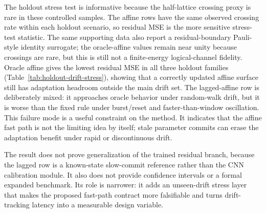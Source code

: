 \documentclass[11pt]{article}
\begin{document}
The holdout stress test is informative because the half-lattice crossing proxy
is rare in these controlled samples.  The affine rows have the same observed
crossing rate within each holdout scenario, so residual MSE is the more
sensitive stress-test statistic.  The same supporting data also report a
residual-boundary Pauli-style identity surrogate; the oracle-affine
values remain near unity because crossings are rare, but this is still not a
finite-energy logical-channel fidelity.  Oracle affine gives the lowest
residual MSE in all three holdout families
(Table~\ref{tab:holdout-drift-stress}), showing that a correctly updated
affine surface still has adaptation headroom outside the main drift set.  The
lagged-affine row is deliberately mixed: it approaches oracle behavior under
random-walk drift, but it is worse than the fixed rule under burst/reset and
faster-than-window oscillation.  This failure mode is a useful constraint on
the method.  It indicates that the affine fast path is not the limiting idea
by itself; stale parameter commits can erase the adaptation benefit under
rapid or discontinuous drift.

The result does not prove generalization of the trained residual branch,
because the lagged row is a known-state slow-commit reference rather than the
CNN calibration module.  It also does not provide confidence intervals or a
formal expanded benchmark.  Its role is narrower: it adds an unseen-drift
stress layer that makes the proposed fast-path contract more falsifiable and
turns drift-tracking latency into a measurable design variable.

\begin{table}[t]
\centering
\small
{}
\caption{Controlled known-state holdout drift stress diagnostic.  Entries are residual MSE
across 384 sequences of 512 steps unless otherwise stated; lower residual MSE
is better.  \(F_{\mathrm{avg}}^{\mathrm{surr}}\) is the Pauli-channel-style
surrogate induced by the oracle-affine residual-boundary identity rate, not a
finite-energy logical-channel fidelity.  The lagged-affine row uses
known-state affine parameters committed every 64 steps with a 32-step lag, and
is a slow-loop lag reference rather than the trained residual branch.  The
table is a non-hardware stress test for the affine contract, not a formal
expanded benchmark, confidence-interval analysis or process-fidelity
estimate.}
\label{tab:holdout-drift-stress}
\end{table}
\end{document}
